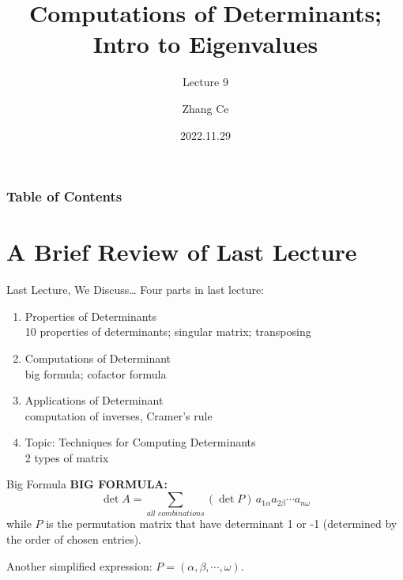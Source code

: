 \documentclass{beamer}
\title[Linear Algebra] %
{Computations of Determinants; Intro to Eigenvalues}
\subtitle{Lecture 9}
\author[zhangc2019@mail.sustech.edu.cn] %
{
    Zhang Ce
}
\institute[] %
{
    Department of Electrical and Electronic Engineering\\
    Southern University of Science and Technology
}
\date[2022.11.29] %
{2022.11.29}
\begin{document}
\frame{\titlepage}


\begin{frame}
\frametitle{Table of Contents}
\tableofcontents
\end{frame}
\section{A Brief Review of Last Lecture}
\begin{frame}{Last Lecture, We Discuss\dots}
Four parts in last lecture:
    \begin{enumerate}
        \item Properties of Determinants\\
        10 properties of determinants; singular matrix; transposing
        \item Computations of Determinant\\
        big formula; cofactor formula
        \item Applications of Determinant\\
        computation of inverses, Cramer's rule
        \item Topic: Techniques for Computing Determinants\\
        2 types of matrix
    \end{enumerate}

\end{frame}

\begin{frame}{Big Formula}
\textbf{BIG FORMULA:}
\begin{equation*}
    \det A=\sum_{all\,\,combinations}{\left( \det P \right)}\,a_{1\alpha}a_{2\beta}\cdots a_{n\omega}
\end{equation*}
while $P$ is the permutation matrix that have determinant 1 or -1 (determined by the order of chosen entries).

\vspace{3pt}
Another simplified expression: $P=\left( \alpha ,\beta ,\cdots ,\omega \right)$.

\end{frame}
\end{document}
